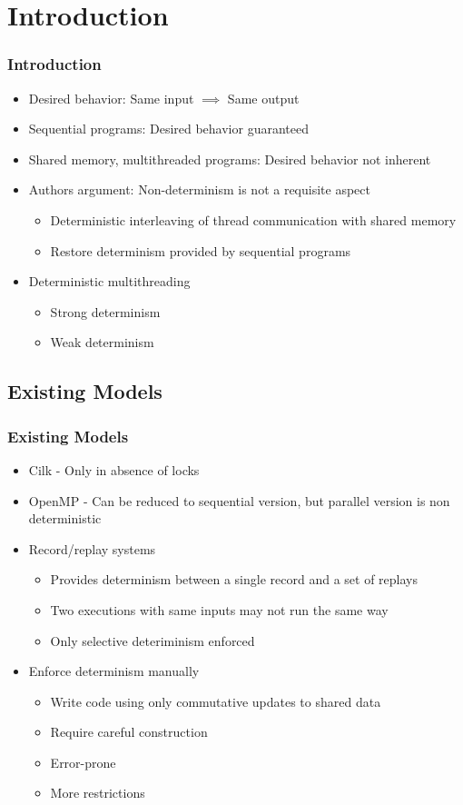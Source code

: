 \documentclass{beamer}
\begin{document}
\section{Introduction}
\begin{frame}
\frametitle{Introduction}
\begin{itemize}
\item Desired behavior: Same input $\implies$ Same output
\item Sequential programs: Desired behavior guaranteed
\item Shared memory, multithreaded programs: Desired behavior not inherent
\item Authors argument: Non-determinism is not a requisite aspect
\begin{itemize}
\item Deterministic interleaving of thread communication with shared memory
\item Restore determinism provided by sequential programs
\end{itemize}
\item Deterministic multithreading
\begin{itemize}
  \item Strong determinism
  \item Weak determinism
\end{itemize}
\end{itemize}
\end{frame}

\subsection{Existing Models}
\begin{frame}
\frametitle{Existing Models}
\begin{itemize}
\item Cilk - Only in absence of locks
\item OpenMP - Can be reduced to sequential version, but parallel version
      is non deterministic
\item Record/replay systems
\begin{itemize}
  \item Provides determinism between a single record and a set of replays
  \item Two executions with same inputs may not run the same way
  \item Only selective deteriminism enforced
\end{itemize}
\item Enforce determinism manually
\begin{itemize}
  \item Write code using only commutative updates to shared data
  \item Require careful construction
  \item Error-prone
  \item More restrictions
\end{itemize}

\end{itemize}
\end{frame}
\end{document}
